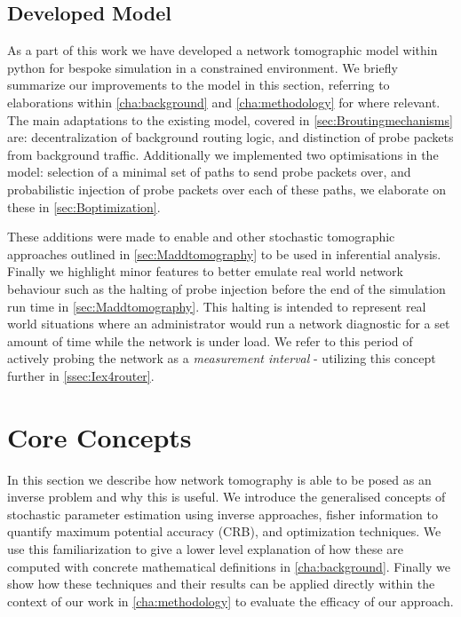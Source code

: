 \subsection{Developed Model}
\label{ssec:Idevelopedmodels}
As a part of this work we have developed a network tomographic model within python for bespoke simulation in a constrained environment. We briefly summarize our improvements to the model in this section, referring to elaborations within \cref{cha:background} and \cref{cha:methodology} for where relevant. The main adaptations to the existing model, covered in \cref{sec:Broutingmechanisms} are: decentralization of background routing logic, and distinction of probe packets from background traffic. Additionally we implemented two optimisations in the model: selection of a minimal set of paths to send probe packets over, and probabilistic injection of probe packets over each of these paths, we elaborate on these in \cref{sec:Boptimization}.\par
These additions were made to enable \pdv and other stochastic tomographic approaches outlined in \cref{sec:Maddtomography} to be used in inferential analysis. Finally we highlight minor features to better emulate real world network behaviour such as the halting of probe injection before the end of the simulation run time in \cref{sec:Maddtomography}. This halting is intended to represent real world situations where an administrator would run a network diagnostic for a set amount of time while the network is under load. We refer to this period of actively probing the network as a \textit{measurement interval} - utilizing this concept further in \cref{ssec:Iex4router}.

\newpage

\section{Core Concepts}
\label{sec:Icoreconcepts}

In this section we describe how network tomography is able to be posed as an inverse problem and why this is useful. We introduce the generalised concepts of stochastic parameter estimation using inverse approaches, fisher information to quantify maximum potential accuracy (CRB), and optimization techniques. We use this familiarization to give a lower level explanation of how these are computed with concrete mathematical definitions in \cref{cha:background}. Finally we show how these techniques and their results can be applied directly within the context of our work in \cref{cha:methodology} to evaluate the efficacy of our approach.

